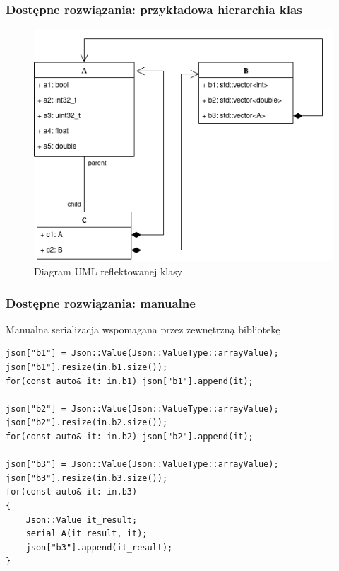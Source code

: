 \documentclass[12pt]{beamer}
\begin{document}
	\begin{frame}
		\frametitle{Dostępne rozwiązania: przykładowa hierarchia klas}

		\begin{figure}[ht!]
			\centering
			\includegraphics[width=0.75\framewidth, keepaspectratio=true]{../paper/img/benchmark_model_uml_diagram.png}
			\caption{Diagram UML reflektowanej klasy}
		\end{figure}

	\end{frame}

	\begin{frame}[fragile]
		\frametitle{Dostępne rozwiązania: manualne}

		Manualna serializacja wspomagana przez zewnętrzną bibliotekę

		\begin{lstlisting}[frame=single]
json["b1"] = Json::Value(Json::ValueType::arrayValue);
json["b1"].resize(in.b1.size());
for(const auto& it: in.b1) json["b1"].append(it);

json["b2"] = Json::Value(Json::ValueType::arrayValue);
json["b2"].resize(in.b2.size());
for(const auto& it: in.b2) json["b2"].append(it);

json["b3"] = Json::Value(Json::ValueType::arrayValue);
json["b3"].resize(in.b3.size());
for(const auto& it: in.b3)
{
	Json::Value it_result;
	serial_A(it_result, it);
	json["b3"].append(it_result);
}
		\end{lstlisting}

	\end{frame}
\end{document}
